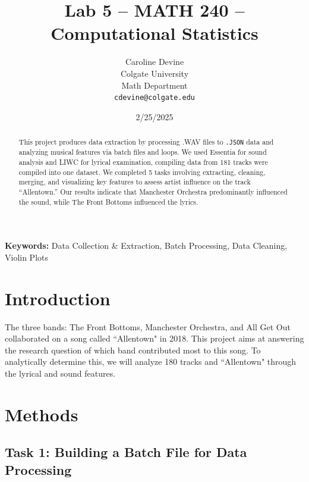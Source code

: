 \documentclass{article}\usepackage[]{graphicx}\usepackage[]{xcolor}
\begin{document}
\vspace{-1in}
\title{Lab 5 -- MATH 240 -- Computational Statistics}

\author{
  Caroline Devine \\
  Colgate University  \\
  Math Department  \\
  {\tt cdevine@colgate.edu}
}

\date{2/25/2025}

\maketitle

\begin{multicols}{2}
\begin{abstract}
This project produces data extraction by processing .WAV files to \texttt{.JSON} data and analyzing musical features via batch files and loops. We used Essentia\citep{Bogdanov} for sound analysis and LIWC\citep{Boyd2022} for lyrical examination, compiling data from 181 tracks were compiled into one dataset.
We completed 5 tasks involving extracting, cleaning, merging, and visualizing key features to assess artist influence on the track ``Allentown.” Our results indicate that Manchester Orchestra predominantly influenced the sound, while The Front Bottoms influenced the lyrics.

\end{abstract}

\noindent \textbf{Keywords:} Data Collection \& Extraction, Batch Processing, Data Cleaning, Violin Plots
\section{Introduction}
The three bands: The Front Bottoms, Manchester Orchestra, and All Get Out collaborated on a song called ``Allentown"\citep{Ross} in 2018. This project aims at answering the research question of which band contributed most to this song. To analytically determine this, we will analyze 180 tracks and ``Allentown" through the lyrical and sound features. 

\section{Methods}

\subsection{Task 1: Building a Batch File for Data Processing}


\end{multicols}
\end{document}
